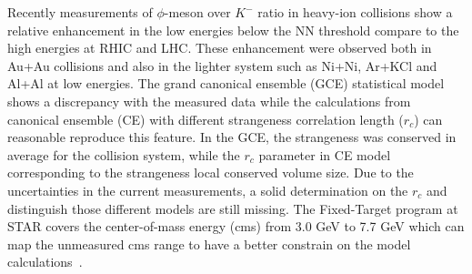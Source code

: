 \documentclass[%
 reprint,	
showpacs,
 amsmath,amssymb,
 aps,
 prc,
]{revtex4-1}
\begin{document}
\maketitle


Recently measurements of $\phi$-meson over $K^-$ ratio in heavy-ion collisions show a relative enhancement in the low energies below the NN threshold compare to the high energies at RHIC and LHC. These enhancement were observed both in Au+Au collisions and also in the lighter system such as Ni+Ni, Ar+KCl and Al+Al at low energies. The grand canonical ensemble (GCE) statistical model shows a discrepancy with the measured data while the calculations from canonical ensemble (CE) with different strangeness correlation length ($r_c$) can reasonable reproduce this feature. In the GCE, the strangeness was conserved in average for the collision system, while the $r_c$ parameter in CE model corresponding to the strangeness local conserved volume size. Due to the uncertainties in the current measurements, a solid determination on the $r_c$ and distinguish those different models are still missing. The Fixed-Target program at STAR covers the center-of-mass energy (cms) from 3.0 GeV to 7.7 GeV which can map the unmeasured cms range to have a better constrain on the model calculations~\cite{}.




\end{document}
